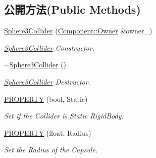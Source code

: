 \subsection*{公開方法(Public Methods)}
\begin{DoxyCompactItemize}
\item 
\hyperlink{class_magnum_1_1_sphere3_collider_aa5b5b4e6547a691989d24cccda5f1b7b}{Sphere3\+Collider} (\hyperlink{class_magnum_1_1_component_1_1_owner}{Component\+::\+Owner} \&owner\+\_\+)
\begin{DoxyCompactList}\small\item\em \hyperlink{class_magnum_1_1_sphere3_collider}{Sphere3\+Collider} Constructor. \end{DoxyCompactList}\item 
\hyperlink{class_magnum_1_1_sphere3_collider_aa1ccc4438ea09b9bae39712f7e967452}{$\sim$\+Sphere3\+Collider} ()
\begin{DoxyCompactList}\small\item\em \hyperlink{class_magnum_1_1_sphere3_collider}{Sphere3\+Collider} Destructor. \end{DoxyCompactList}\item 
\hyperlink{class_magnum_1_1_sphere3_collider_aa7973001bb8beb86aa5ee42572d536e8}{P\+R\+O\+P\+E\+R\+TY} (bool, Static)
\begin{DoxyCompactList}\small\item\em Set if the Collider is Static Rigid\+Body. \end{DoxyCompactList}\item 
\hyperlink{class_magnum_1_1_sphere3_collider_a00f41bcea1382aa2b83321965a5cd3a5}{P\+R\+O\+P\+E\+R\+TY} (float, Radius)
\begin{DoxyCompactList}\small\item\em Set the Radius of the Capsule. \end{DoxyCompactList}\end{DoxyCompactItemize}
